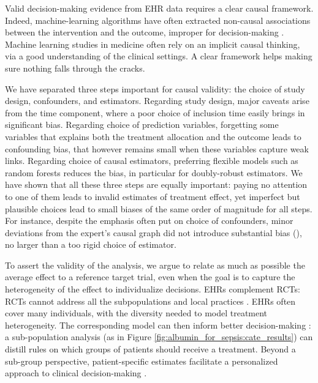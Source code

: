 \documentclass[10pt,letterpaper]{article}
\begin{document}


Valid decision-making evidence from EHR data requires a clear causal framework.
Indeed, machine-learning algorithms have often extracted non-causal associations
between the intervention and the outcome, improper for decision-making
\cite{winkler2019association,badgeley2019deep,obermeyer2019dissecting}.
Machine learning studies in medicine often rely on an implicit causal
thinking, via a good understanding of the clinical settings.
A clear framework helps making
sure nothing falls through the cracks.

We have separated three steps important for causal validity: the choice
of study design, confounders, and estimators.
%
Regarding study design, major caveats arise from the time component,
where a poor choice of inclusion time easily brings in significant bias. Regarding choice of prediction
variables, forgetting some variables that explains both the treatment
allocation and the outcome leads to confounding bias, that however
remains small when these
variables capture weak links. Regarding choice of causal estimators,
preferring flexible models such as random forests reduces the bias, in
particular for doubly-robust estimators.
%
We have shown that all these three steps are equally important: paying no
attention to one of them leads to invalid estimates of treatment effect,
yet imperfect but plausible choices lead to small biases of the same
order of magnitude for all steps.
%
For instance, despite the emphasis often put on choice of confounders,
minor deviations from the expert's causal graph did not introduce
substantial bias (), no larger than a too
rigid choice of estimator.


To assert the validity of the analysis, we argue to relate as much as
possible the average effect to a reference target trial, even when the
goal is to capture the heterogeneity of the effect to individualize
decisions.
EHRs complement RCTs: RCTs cannot address all the
subpopulations and local practices
\cite{travers2007external,kennedy2015literature}. EHRs often cover many
individuals, with the diversity needed to model treatment
heterogeneity. The corresponding model can then inform better
decision-making \cite{prosperi2020causal}: a sub-population analysis  (as in Figure
\ref{fig:albumin_for_sepsis:cate_results}) can distill rules on which groups
of patients should receive a treatment. Beyond a sub-group perspective,
patient-specific estimates facilitate a personalized approach
to clinical decision-making \cite{kent2018personalized}.
%
\end{document}
